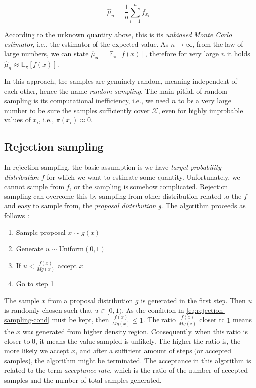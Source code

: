 \documentclass[
  digital, %
  oneside, %
  lof,     %
  lot,     %
]{fithesis4}
\begin{document}
\begin{equation}
  \hat{\mu}_n = \frac{1}{n} \sum_{i=1}^{n} f_{x_i}
\end{equation}

According to the unknown quantity above, this is its \textit{unbiased Monte Carlo estimator}, i.e., the estimator of the expected value. 
As $n \to \infty$, from the law of large numbers, we can state $\hat{\mu}_{\infty} = \mathbb{E}_{\pi}\left[ f(x) \right]$, therefore for very large $n$ it holds $\hat{\mu}_n \approx \mathbb{E}_{\pi}\left[ f(x) \right]$.

In this approach, the samples are genuinely random, meaning independent of each other, hence the name \textit{random sampling}.
The main pitfall of random sampling is its computational inefficiency, i.e., we need $n$ to be a very large number to be sure the samples sufficiently cover $\mathcal{X}$, even for highly improbable values of $x_i$, i.e., $\pi(x_i) \approx 0$.


\subsection{Rejection sampling}
\label{sec:rejection-sampling}

In rejection sampling, the basic assumption is we have \textit{target probability distribution} $f$ for which we want to estimate some quantity.
Unfortunately, we cannot sample from $f$, or the sampling is somehow complicated.
Rejection sampling can overcome this by sampling from other distribution related to the $f$ and easy to sample from, the \textit{proposal distribution} $g$.
The algorithm proceeds as follows \cite{beichl2000}:

\begin{enumerate}
  \item Sample proposal $x \sim g(x)$
  \item Generate $u \sim \text{Uniform}(0, 1)$
  \item If $u < \frac{f(x)}{M g(x)}$ accept $x$
  \item Go to step 1
\end{enumerate}

The sample $x$ from a proposal distribution $g$ is generated in the first step.
Then $u$ is randomly chosen such that $u \in [0, 1)$.
As the condition in \eqref{eq:rejection-sampling-cond} must be kept, then $\frac{f(x)}{M g(x)} \leq 1$.
The ratio $\frac{f(x)}{M g(x)}$ closer to $1$ means the $x$ was generated from higher density region.
Consequently, when this ratio is closer to $0$, it means the value sampled is unlikely.
The higher the ratio is, the more likely we accept $x$, and after a sufficient amount of steps (or accepted samples), the algorithm might be terminated.
The acceptance in this algorithm is related to the term \textit{acceptance rate}, which is the ratio of the number of accepted samples and the number of total samples generated.
\end{document}
